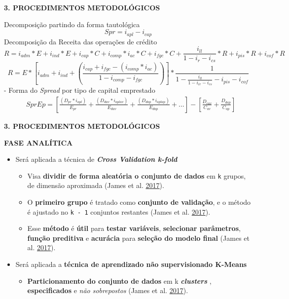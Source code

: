 \documentclass[ignorenonframetext,aspectratio=169,ignorenonframetext]{beamer}
\providecommand{\tightlist}{%
  \setlength{\itemsep}{0pt}\setlength{\parskip}{0pt}}
\begin{document}
\begin{frame}{\textbf{3. PROCEDIMENTOS METODOLÓGICOS}}
\protect\hypertarget{procedimentos-metodoluxf3gicos-3}{}

Decomposição partindo da forma tautológica \[
Spr = i_{apl} - i_{cap} 
\] Decomposição da Receita das operações de crédito \[
R = i_{adm}*E + i_{ind}*E + i_{cap}*C + i_{comp}*i_{ac}*C + i_{fgc}*C + \frac{i_{ll}}{1 - i_{r} - i_{cs}}*R + i_{pis}*R + i_{cof}*R 
\] \[
R = E * [i_{adm} + i_{ind} + (\frac{i_{cap}+ i_{fgc} - (i_{comp}*i_{ac})}{1 - i_{comp} - i_{fgc}})] *  \frac{1}
{1 -  \frac{i_{ll}}{1 - i_{ir}  - i_{cs}} - i_{pis} - i_{cof}}
\] - Forma do \emph{Spread} por tipo de capital emprestado
\[\begin{aligned}
& SprEp = [\frac{(D_{pr}* i_{apl})}{E_{pr}} + \frac{(D_{dav}* i_{aplav})}{E_{dav}} + \frac{(D_{dap}* i_{aplap})}{E_{dap}} + ...] - [ \frac{D_{cav}}{C_{av}} + \frac{D_{dap}}{C_{ap}} ]
\end{aligned}\]

\end{frame}

\begin{frame}[fragile]{\textbf{3. PROCEDIMENTOS METODOLÓGICOS}}
\protect\hypertarget{procedimentos-metodoluxf3gicos-4}{}

\textbf{FASE ANALÍTICA}

\begin{itemize}
\tightlist
\item
  Será aplicada a técnica de \textbf{\emph{Cross Validation k-fold}}

  \begin{itemize}
  \item
    Visa \textbf{dividir de forma aleatória o conjunto de dados} em
    \texttt{k} grupos, de dimensão aproximada (James et al.
    \protect\hyperlink{ref-gareth:2017}{2017}).
  \item
    O \textbf{primeiro grupo} é tratado como \textbf{conjunto de
    validação}, e o método é ajustado no \texttt{k\ -\ 1} conjuntos
    restantes (James et al. \protect\hyperlink{ref-gareth:2017}{2017}).
  \item
    Esse \textbf{método} é \textbf{útil} para \textbf{testar variáveis},
    \textbf{selecionar parâmetros}, \textbf{função preditiva} e
    \textbf{acurácia} para \textbf{seleção do modelo final} (James et
    al. \protect\hyperlink{ref-gareth:2017}{2017}).
  \end{itemize}
\item
  Será aplicada a \textbf{técnica de aprendizado não supervisionado
  K-Means}

  \begin{itemize}
  \tightlist
  \item
    \textbf{Particionamento do conjunto de dados} em k
    \textbf{\emph{clusters}} , \textbf{especificados} e \emph{não
    sobrepostos} (James et al.
    \protect\hyperlink{ref-gareth:2017}{2017}).
  \end{itemize}
\end{itemize}

\end{frame}
\end{document}

